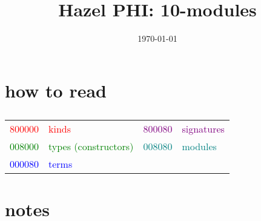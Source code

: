 \documentclass[12pt,fleqn]{article}
\newcommand{\red}[1]{\textcolor{red}{#1}}
\newcommand{\green}[1]{\textcolor{green}{#1}}
\newcommand{\blue}[1]{\textcolor{blue}{#1}}
\newcommand{\purple}[1]{\textcolor{purple}{#1}}
\newcommand{\teal}[1]{\textcolor{teal}{#1}}
\begin{document}
\title{Hazel PHI: 10-modules}
\author{}
\date{\today}
\maketitle
\section{how to read}
\subsection*{}
\begin{tabular}{rlrl}
    \red{800000} & \red{kinds} & \purple{800080} & \purple{signatures} \\
    \green{008000} & \green{types (constructors)} & \teal{008080} & \teal{modules} \\
    \blue{000080} & \blue{terms} && \\
\end{tabular}
\section{notes}
\end{document}
